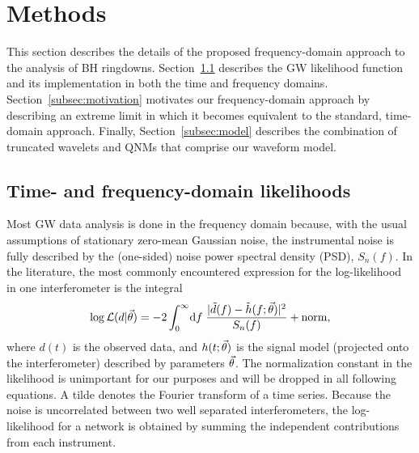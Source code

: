 \section{Methods}\label{sec:methods}

This section describes the details of the proposed frequency-domain approach to the analysis of BH ringdowns. 
Section~\ref{subsec:data_analysis} describes the GW likelihood function and its implementation in both the time and frequency domains.
Section~\ref{subsec:motivation} motivates our frequency-domain approach by describing an extreme limit in which it becomes equivalent to the standard, time-domain approach.
Finally, Section~\ref{subsec:model} describes the combination of truncated wavelets and QNMs that comprise our waveform model.


\subsection{Time- and frequency-domain likelihoods}\label{subsec:data_analysis}

Most GW data analysis is done in the frequency domain because, with the usual assumptions of stationary zero-mean Gaussian noise, the instrumental noise is fully described by the (one-sided) noise power spectral density (PSD), $S_n(f)$.
In the literature, the most commonly encountered expression for the log-likelihood in one interferometer is the integral
\begin{align} \label{eq:logL_FD_continuous}
	\log\mathcal{L}(d|\vec{\theta}) = -2\int_{0}^{\infty}\!\mathrm{d}f\;\frac{|\tilde{d}(f)-\tilde{h}(f;\vec{\theta})|^2}{S_n(f)} + \mathrm{norm},
\end{align}
where $d(t)$ is the observed data, and $h(t;\vec{\theta})$ is the signal model (projected onto the interferometer) described by parameters $\vec{\theta}$.
The normalization constant in the likelihood is unimportant for our purposes and will be dropped in all following equations.
A tilde denotes the Fourier transform of a time series.
Because the noise is uncorrelated between two well separated interferometers, the log-likelihood for a network is obtained by summing the independent contributions from each instrument.

